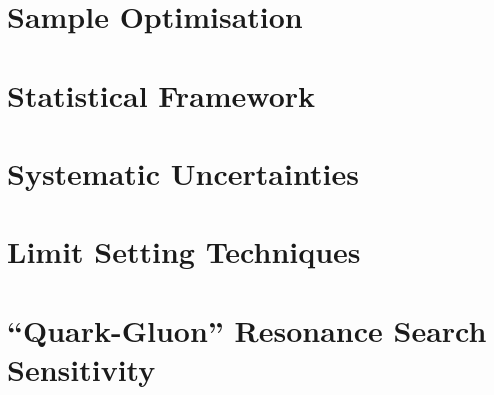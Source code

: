 \documentclass[NOTE, atlasdraft=true, texlive=2016, UKenglish]{atlasdoc}
\begin{document}
\section{Sample Optimisation}

\clearpage



\section{Statistical Framework}

%

%
%
%
\section{Systematic Uncertainties}
%

%
\clearpage
%
%
%
\section{Limit Setting Techniques}

\clearpage


\section{``Quark-Gluon'' Resonance Search Sensitivity}

\end{document}
